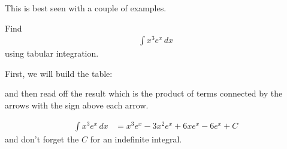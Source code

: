 This is best seen with a couple of examples.  

\begin{example}
Find 
%
\begin{align*}
\int x^3 e^x \, dx
\end{align*}
using tabular integration. 

\solution

First, we will build the table:

\begin{center}
\end{center}
and then read off the result which is the product of terms connected by the arrows with the sign above each arrow. 

\begin{align*}
\int x^3 e^x \, dx & = x^3 e^x - 3x^2 e^x + 6x e^x - 6 e^x + C 
\end{align*}
and don't forget the $C$ for an indefinite integral.  
\end{example}

